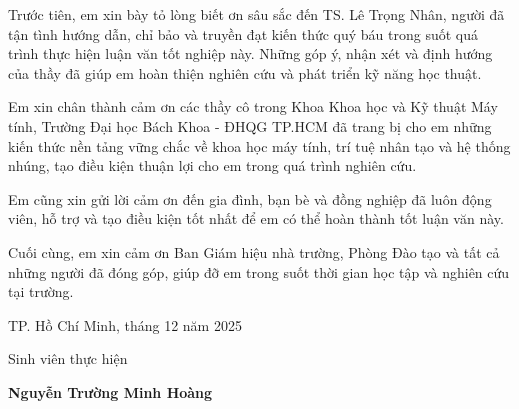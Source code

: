 \begin{acknowledgement}
Trước tiên, em xin bày tỏ lòng biết ơn sâu sắc đến TS. Lê Trọng Nhân, người đã tận tình hướng dẫn, chỉ bảo và truyền đạt kiến thức quý báu trong suốt quá trình thực hiện luận văn tốt nghiệp này. Những góp ý, nhận xét và định hướng của thầy đã giúp em hoàn thiện nghiên cứu và phát triển kỹ năng học thuật.

Em xin chân thành cảm ơn các thầy cô trong Khoa Khoa học và Kỹ thuật Máy tính, Trường Đại học Bách Khoa - ĐHQG TP.HCM đã trang bị cho em những kiến thức nền tảng vững chắc về khoa học máy tính, trí tuệ nhân tạo và hệ thống nhúng, tạo điều kiện thuận lợi cho em trong quá trình nghiên cứu.

Em cũng xin gửi lời cảm ơn đến gia đình, bạn bè và đồng nghiệp đã luôn động viên, hỗ trợ và tạo điều kiện tốt nhất để em có thể hoàn thành tốt luận văn này.

Cuối cùng, em xin cảm ơn Ban Giám hiệu nhà trường, Phòng Đào tạo và tất cả những người đã đóng góp, giúp đỡ em trong suốt thời gian học tập và nghiên cứu tại trường.

TP. Hồ Chí Minh, tháng 12 năm 2025

\hfill Sinh viên thực hiện

\hfill \textbf{Nguyễn Trường Minh Hoàng}
\end{acknowledgement}
